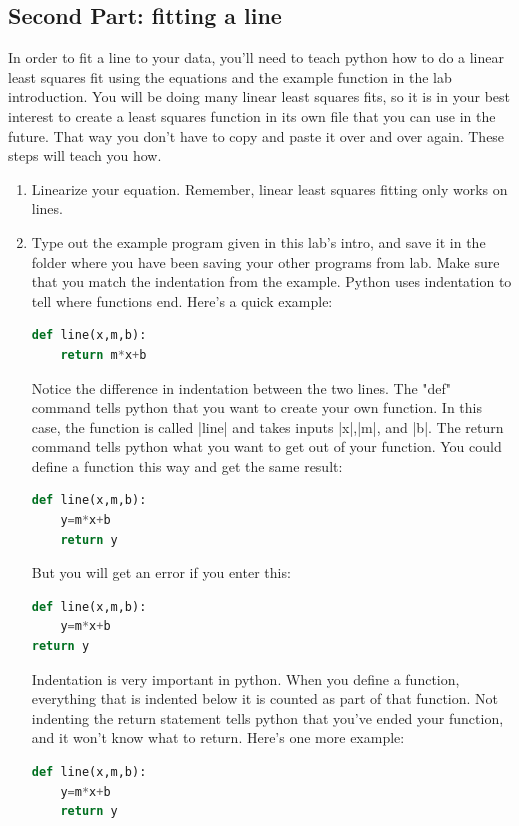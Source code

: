 \documentclass{book}
\begin{document}
\subsection{Second Part: fitting a line}
In order to fit a line to your data, you'll need to teach python how to do a linear least squares fit using the equations and the example function in the lab introduction.  You will be doing many linear least squares fits, so it is in your best interest to create a least squares function in its own file that you can use in the future.  That way you don't have to copy and paste it over and over again. These steps will teach you how.
\begin{enumerate}
\item Linearize your equation.  Remember, linear least squares fitting only works on lines.
\item Type out the example program given in this lab's intro, and save it in the folder where you have been saving your other programs from lab.  Make sure that you match the indentation from the example.  Python uses indentation to tell where functions end.  Here's a quick example:
\begin{lstlisting}[language=python]
def line(x,m,b):
    return m*x+b
\end{lstlisting}

Notice the difference in indentation between the two lines. The "def" command tells python that you want to create your own function.  In this case, the function is called |line| and takes inputs |x|,|m|, and |b|.  The return command tells python what you want to get out of your function.  You could define a function this way and get the same result:

\begin{lstlisting}[language=python]
def line(x,m,b):
    y=m*x+b
    return y
\end{lstlisting}

But you will get an error if you enter this:
\begin{lstlisting}[language=python]
def line(x,m,b):
    y=m*x+b
return y
\end{lstlisting}
Indentation is very important in python.  When you define a function, everything that is indented below it is counted as part of that function.  Not indenting the return statement tells python that you've ended your function, and it won't know what to return.
Here's one more example:
\begin{lstlisting}[language=python]
def line(x,m,b):
    y=m*x+b
    return y


\end{lstlisting}
\end{enumerate}
\end{document}
